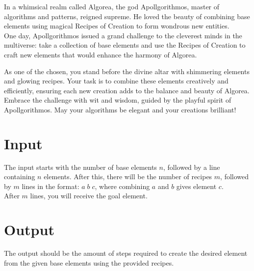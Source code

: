 In a whimsical realm called Algorea, the god Apollgorithmos, master of algorithms and patterns, reigned supreme. He loved the beauty of combining base elements using magical Recipes of Creation to form wondrous new entities.\\
One day, Apollgorithmos issued a grand challenge to the cleverest minds in the multiverse: take a collection of base elements and use the Recipes of Creation to craft new elements that would enhance the harmony of Algorea.\\


As one of the chosen, you stand before the divine altar with shimmering elements and glowing recipes. Your task is to combine these elements creatively and efficiently, ensuring each new creation adds to the balance and beauty of Algorea.\\
Embrace the challenge with wit and wisdom, guided by the playful spirit of Apollgorithmos. May your algorithms be elegant and your creations brilliant!
\section*{Input}
The input starts with the number of base elements \(n\), followed by a line containing \(n\) elements. After this, there will be the number of recipes \(m\), followed by \(m\) lines in the format: \(a\;b\;c\), where combining \(a\) and \(b\) gives element \(c\).\\
After \(m\) lines, you will receive the goal element.
\section*{Output}
The output should be the amount of steps required to create the desired element from the given base elements using the provided recipes.
